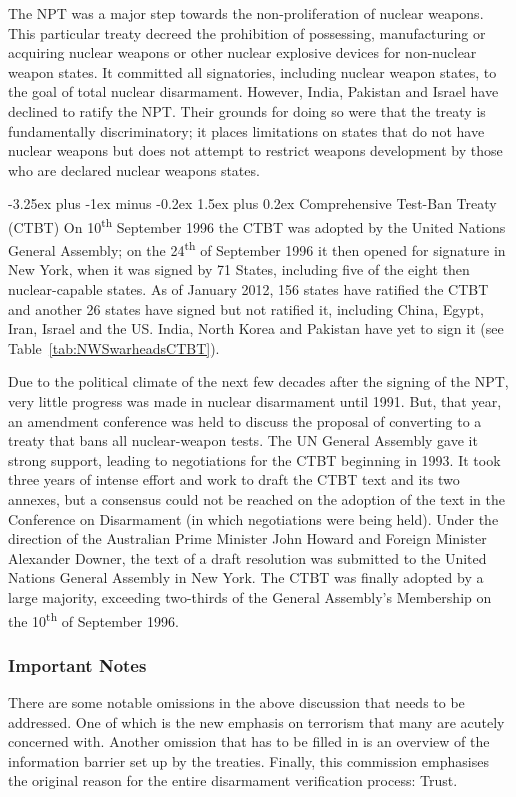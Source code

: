\documentclass[twoside,titlepage,11pt,twocolumn,a4paper]{article}
\makeatletter
\renewcommand{\paragraph}{\@startsection{paragraph}{4}{0ex}%
   {-3.25ex plus -1ex minus -0.2ex}%
   {1.5ex plus 0.2ex}%
   {\normalfont\normalsize\bfseries}}
\makeatother
\begin{document}
The NPT was a major step towards the non-proliferation of nuclear
weapons. This particular treaty decreed the prohibition of possessing,
manufacturing or acquiring nuclear weapons or other nuclear explosive
devices for non-nuclear weapon states. It committed all signatories,
including nuclear weapon states, to the goal of total nuclear
disarmament. However, India, Pakistan and Israel have declined to
ratify the NPT. Their grounds for doing so were that the treaty is
fundamentally discriminatory; it places limitations on states that do
not have nuclear weapons but does not attempt to restrict weapons
development by those who are declared nuclear weapons states.

\paragraph{Comprehensive Test-Ban Treaty (CTBT)}
On 10\textsuperscript{th} September 1996 the CTBT was adopted by the
United Nations General Assembly; on the 24\textsuperscript{th} of
September 1996 it then opened for signature in New York, when it was
signed by 71 States, including five of the eight then nuclear-capable
states. As of January 2012, 156 states have ratified the CTBT and
another 26 states have signed but not ratified it, including China,
Egypt, Iran, Israel and the US. India, North Korea and
Pakistan have yet to sign it (see Table~\ref{tab:NWSwarheadsCTBT}).

Due to the political climate of the next few decades after the signing
of the NPT, very little progress was made in nuclear disarmament until
1991. But, that year, an amendment conference was held to discuss the
proposal of converting to a treaty that bans all nuclear-weapon
tests. The UN General Assembly gave it strong support, leading to
negotiations for the CTBT beginning in 1993. It took three years of
intense effort and work to draft the CTBT text and its two annexes,
but a consensus could not be reached on the adoption of the text in
the Conference on Disarmament (in which negotiations were being
held). Under the direction of the Australian Prime Minister John
Howard and Foreign Minister Alexander Downer, the text of a draft
resolution was submitted to the United Nations General Assembly in New
York. The CTBT was finally adopted by a large majority, exceeding
two-thirds of the General Assembly's Membership on the
10\textsuperscript{th} of September 1996.

\subsubsection{Important Notes}
There are some notable omissions in the above discussion that needs to
be addressed. One of which is the new emphasis on terrorism that many
are acutely concerned with. Another omission that has to be filled in
is an overview of the information barrier set up by the
treaties. Finally, this commission emphasises the original reason for
the entire disarmament verification process: Trust.
\end{document}
